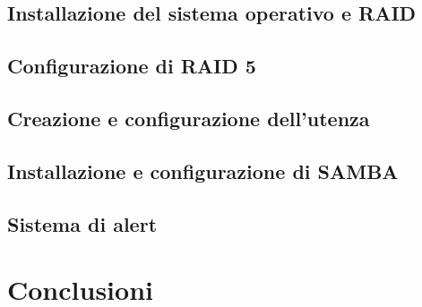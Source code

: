 \documentclass[11pt]{article}
\begin{document}
\subsection{Installazione del sistema operativo e RAID}
\subsection{Configurazione di RAID 5}
\subsection{Creazione e configurazione dell'utenza}
\subsection{Installazione e configurazione di SAMBA}
\subsection{Sistema di alert}



\section{Conclusioni}
\end{document}
